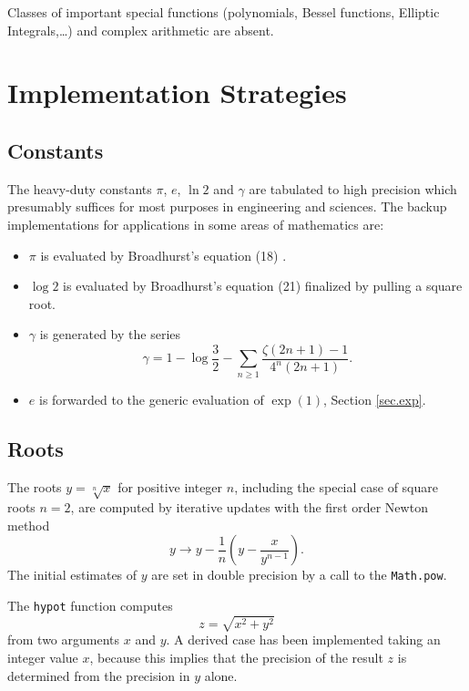 \documentclass[showpacs,showkeys,amssymb,aps,twocolumn]{revtex4-1}
\begin{document}
Classes of important special functions (polynomials, Bessel functions, Elliptic Integrals,\ldots)
and complex arithmetic are absent.

\section{Implementation Strategies}

\subsection{Constants}

The heavy-duty constants $\pi$, $e$, $\ln 2$ and $\gamma$
are tabulated to high precision which presumably suffices
for most purposes in engineering and sciences. The backup implementations
for applications in some areas of mathematics are:
\begin{itemize} 
\item
$\pi$ is evaluated by
Broadhurst's
equation (18) \cite{BroadhurstArxiv98}.
\item
$\log 2$ is evaluated by
Broadhurst's
equation (21) \cite{BroadhurstArxiv98} finalized by pulling
a square root.
\item
$\gamma$ is generated  by the series \cite[(3.9)]{DilcherAM48}
\begin{equation}
\gamma = 1-\log\frac{3}{2}-\sum_{n\ge 1}\frac{\zeta(2n+1)-1}{4^n(2n+1)}
.
\end{equation}
\item
$e$ is forwarded to the generic evaluation of $\exp(1)$, Section \ref{sec.exp}.
\end{itemize} 

\subsection{Roots}\label{sec.root}

The roots $y=\sqrt[n]x$ for positive integer $n$, including the special case
of square roots $n=2$, are computed by iterative updates with
the first order Newton method \cite[(3.96)]{AS}
\begin{equation}
y\to y-\frac{1}{n}\left( y-\frac{x}{y^{n-1}} \right)
.
\end{equation}
The initial estimates of $y$ are
set in double precision by a call to the \texttt{Math.pow}.

The \texttt{hypot} function computes
\begin{equation}
z=\sqrt{x^2+y^2}
\end{equation}
from two arguments $x$ and $y$. A derived case has been implemented
taking an integer value $x$, because this implies that the precision of the
result $z$ is determined from the precision in $y$ alone.
\end{document}
